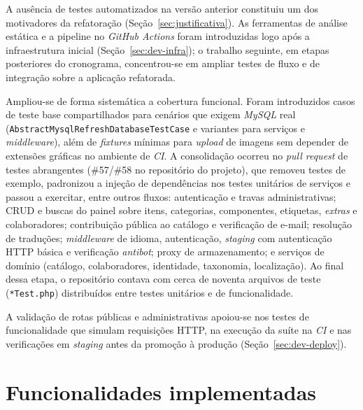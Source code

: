 A ausência de testes automatizados na versão anterior constituiu um dos motivadores da refatoração (Seção~\ref{sec:justificativa}). As ferramentas de análise estática e a pipeline no \textit{GitHub Actions} foram introduzidas logo após a infraestrutura inicial (Seção~\ref{sec:dev-infra}); o trabalho seguinte, em etapas posteriores do cronograma, concentrou-se em ampliar testes de fluxo e de integração sobre a aplicação refatorada.

Ampliou-se de forma sistemática a cobertura funcional. Foram introduzidos casos de teste base compartilhados para cenários que exigem \textit{MySQL} real (\texttt{AbstractMysqlRefreshDatabaseTestCase} e variantes para serviços e \textit{middleware}), além de \textit{fixtures} mínimas para \textit{upload} de imagens sem depender de extensões gráficas no ambiente de \textit{CI}. A consolidação ocorreu no \textit{pull request} de testes abrangentes (\#57/\#58 no repositório do projeto), que removeu testes de exemplo, padronizou a injeção de dependências nos testes unitários de serviços e passou a exercitar, entre outros fluxos: autenticação e travas administrativas; CRUD e buscas do painel sobre itens, categorias, componentes, etiquetas, \textit{extras} e colaboradores; contribuição pública ao catálogo e verificação de e-mail; resolução de traduções; \textit{middleware} de idioma, autenticação, \textit{staging} com autenticação HTTP básica e verificação \textit{antibot}; proxy de armazenamento; e serviços de domínio (catálogo, colaboradores, identidade, taxonomia, localização). Ao final dessa etapa, o repositório contava com cerca de noventa arquivos de teste (\texttt{*Test.php}) distribuídos entre testes unitários e de funcionalidade.

A validação de rotas públicas e administrativas apoiou-se nos testes de funcionalidade que simulam requisições HTTP, na execução da suíte na \textit{CI} e nas verificações em \textit{staging} antes da promoção à produção (Seção~\ref{sec:dev-deploy}).


\section{Funcionalidades implementadas}\label{sec:dev-funcionalidades}

